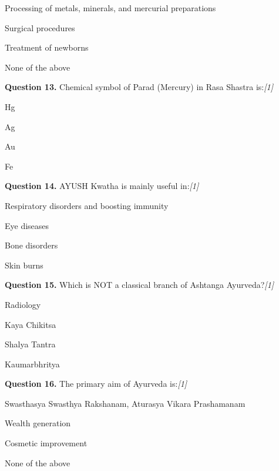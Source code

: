 \documentclass[11pt,a4paper]{article}
\newcommand{\pts}[1]{\hfill   \textit{[#1]}}
\begin{document}
\begin{parts}
  \item Processing of metals, minerals, and mercurial preparations
  \item Surgical procedures
  \item Treatment of newborns
  \item None of the above
\end{parts}

\medskip




\noindent   \textbf{Question 13.} Chemical symbol of Parad (Mercury) in Rasa Shastra is:\pts{1}

\begin{parts}
  \item Hg
  \item Ag
  \item Au
  \item Fe
\end{parts}

\medskip




\noindent   \textbf{Question 14.} AYUSH Kwatha is mainly useful in:\pts{1}

\begin{parts}
  \item Respiratory disorders and boosting immunity
  \item Eye diseases
  \item Bone disorders
  \item Skin burns
\end{parts}

\medskip




\noindent   \textbf{Question 15.} Which is NOT a classical branch of Ashtanga Ayurveda?\pts{1}

\begin{parts}
  \item Radiology
  \item Kaya Chikitsa
  \item Shalya Tantra
  \item Kaumarbhritya
\end{parts}

\medskip




\noindent   \textbf{Question 16.} The primary aim of Ayurveda is:\pts{1}

\begin{parts}
  \item Swasthasya Swasthya Rakshanam, Aturasya Vikara Prashamanam
  \item Wealth generation
  \item Cosmetic improvement
  \item None of the above
\end{parts}
\end{document}
